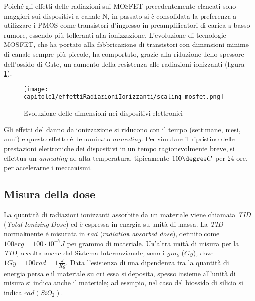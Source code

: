\vspace*{0.5cm}

Poiché gli effetti delle radiazioni sui MOSFET precedentemente elencati sono maggiori sui dispositivi a canale N, in passato si è consolidata la preferenza a utilizzare i PMOS come transistori d'ingresso in preamplificatori di carica a basso rumore, essendo più tolleranti alla ionizzazione. L'evoluzione di tecnologie MOSFET, che ha portato alla fabbricazione di transistori con dimensioni minime di canale sempre più piccole, ha comportato, grazie alla riduzione dello spessore dell'ossido di Gate, un aumento della resistenza alle radiazioni ionizzanti (figura \ref{fig:scaling_mosfet}).  

\begin{figure}[ht]
	\centering

	\texttt{[image: capitolo1/effettiRadiazioniIonizzanti/scaling\_mosfet.png]}
	\caption[Scaling dei dispositivi elettroni]{Evoluzione delle dimensioni nei dispositivi elettronici \cite{effetti_radiazioni_scaling:Nanoelectronics_and_nanolithography}}
	\label{fig:scaling_mosfet}
\end{figure}


\vspace{0.5cm}

Gli effetti del danno da ionizzazione si riducono con il tempo (settimane, mesi, anni) e questo effetto è denominato \emph{annealing}. Per simulare il ripristino delle prestazioni elettroniche dei dispositivi in un tempo ragionevolmente breve, si effettua un \emph{annealing} ad alta temperatura, tipicamente $100\degree C$ per 24 ore, per accelerarne i meccanismi.

\subsection{Misura della dose}
La quantità di radiazioni ionizzanti assorbite da un materiale viene chiamata \textit{TID} (\textit{Total Ionizing Dose}) ed è espressa in energia su unità di massa.
La \textit{TID} normalmente è misurata in $rad$ (\textit{radiation absorbed dose}), definito come $100 erg  = 100 \cdot 10^{-7} J$ per grammo di materiale. Un'altra unità di misura per la \textit{TID}, accolta anche dal Sistema Internazionale, sono i \textit{gray} ($Gy$), dove $1 Gy = 100rad = 1\frac{J}{Kg}$.
Data l'esistenza di una dipendenza tra la quantità di energia persa e il materiale su cui essa si deposita, spesso insieme all'unità di misura si indica anche il materiale; ad esempio, nel caso del biossido di silicio si indica $rad(SiO_{2})$. 




